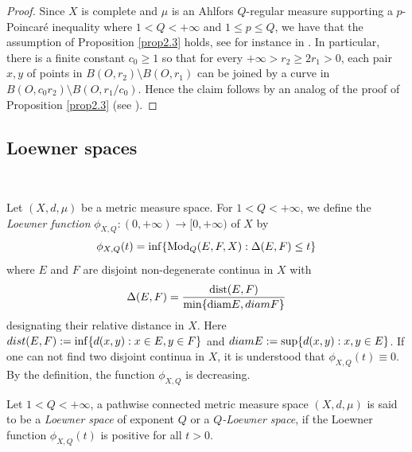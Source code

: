 \documentclass[10pt]{amsart}
\newtheorem{proposition}[theorem]{Proposition}
\numberwithin{equation}{section}
\begin{document}
\begin{proof} Since $X$ is complete and $\mu$ is an Ahlfors $Q$-regular measure supporting a $p$-Poincar\'e inequality where $1<Q<+\infty$ and $1\le p\le Q$, we have that the assumption of Proposition \ref{prop2.3} holds, see for instance in \cite[Theorem 3.3]{K07}. In particular, there is a finite constant $c_0\geq 1$ so that for every $+\infty>r_2\geq 2r_1>0$, each pair $x,y$ of points in $B(O,r_2)\setminus B(O,r_1)$ can be joined by a curve in $B(O,c_0r_2)\setminus B(O,r_1/c_0)$. Hence the claim follows by an analog of the proof of Proposition \ref{prop2.3} (see \cite[Lemma 2.3]{KN22}).
\end{proof}
%
\subsection{Loewner spaces}\ 

Let $(X,d,\mu)$ be a metric measure space. For $1<Q<+\infty$, we define the {\it Loewner function} $\phi_{X,Q}:(0,+\infty)\to [0,+\infty)$ of $X$ by 
\[
	\phi_{X,Q}(t)=\inf \{\text{\rm Mod}_Q(E,F,X): \Delta(E,F)\leq t \}
\]
where $E$ and $F$ are disjoint non-degenerate continua in $X$ with 
	\[
		\Delta(E,F)=\frac{\text{\rm dist}(E,F)}{\min\{\text{\rm diam}E, {\rm diam} F\}}
	\]
designating their relative distance in $X$. Here ${\rm dist}(E,F):=\inf\{d(x,y): x\in E, y\in F \}$ and ${\rm diam}E:=\sup\{d(x,y): x,y\in E\}$. If one can not find two disjoint continua in $X$, it is understood that $\phi_{X,Q}(t)\equiv 0$. By the definition, the function $\phi_{X,Q}$ is decreasing.

Let $1<Q<+\infty$, a pathwise connected metric measure space $(X,d,\mu)$ is said to be a {\it Loewner space} of exponent $Q$ or a {\it $Q$-Loewner space}, if the Loewner function $\phi_{X,Q}(t)$ is positive for all $t>0$. 
\end{document}
